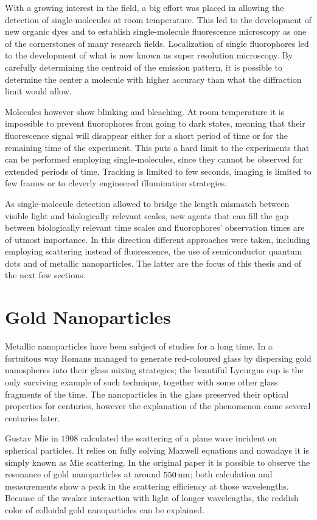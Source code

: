 With a growing interest in the field, a big effort was placed in allowing the
detection of single-molecules at room temperature. This led to the development
of new organic dyes and to establish single-molecule fluorescence microscopy as
one of the cornerstones of many research fields. Localization of single
fluorophores led to the development of what is now known as super resolution
microscopy. By carefully determining the centroid of the emission pattern, it is
possible to determine the center a molecule with higher accuracy than what the
diffraction limit would allow. 

Molecules however show blinking and bleaching. At room temperature it is
impossible to prevent fluorophores from going to dark states, meaning that their
fluorescence signal will disappear either for a short period of time or for the
remaining time of the experiment. This puts a hard limit to the experiments that
can be performed employing single-molecules, since they cannot be observed for
extended periods of time. Tracking is limited to few seconds, imaging is limited
to few frames or to cleverly engineered illumination strategies. 

As single-molecule detection allowed to bridge the length mismatch between
visible light and biologically relevant scales, new agents that can fill the gap
between biologically relevant time scales and fluorophores' observation times
are of utmost importance. In this direction different approaches were taken,
including employing scattering instead of fluorescence, the use of semiconductor
quantum dots and of metallic nanoparticles. The latter are the focus of this
thesis and of the next few sections. 

\section{Gold Nanoparticles}
Metallic nanoparticles have been subject of studies for a long time. In a
fortuitous way Romans managed to generate red-coloured glass by dispersing gold
nanospheres into their glass mixing strategies; the beautiful Lycurgus cup is
the only surviving example of such technique, together with some other glass
fragments of the time. The nanoparticles in the glass preserved their optical
properties for centuries, however the explanation of the phenomenon came several
centuries later.

Gustav Mie in $1908$ calculated the scattering of a plane wave incident on
spherical particles. It relies on fully solving Maxwell equations and nowadays
it is simply known as Mie scattering. In the original paper it is possible to
observe the resonance of gold nanoparticles at around $550\,\textrm{nm}$; both calculation
and measurements show a peak in the scattering efficiency at those wavelengths.
Because of the weaker interaction with light of longer wavelengths, the reddish
color of colloidal gold nanoparticles can be explained.

